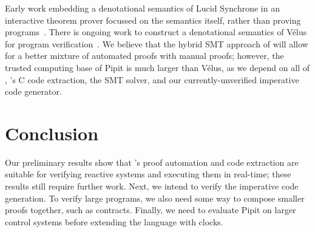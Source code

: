 \documentclass[sigplan,screen, review]{acmart}
\begin{document}
Early work embedding a denotational semantics of Lucid Synchrone in an interactive theorem prover focussed on the semantics itself, rather than proving programs~\cite{boulme2001clocked}.
There is ongoing work to construct a denotational semantics of Vélus for program verification~\cite{bourke2022towards}.
We believe that the hybrid SMT approach of \fstar{} will allow for a better mixture of automated proofs with manual proofs;
however, the trusted computing base of Pipit is much larger than Vélus, as we depend on all of \fstar{}, \lowstar{}'s C code extraction, the SMT solver, and our currently-unverified imperative code generator.




\section{Conclusion}

Our preliminary results show that \fstar{}'s proof automation and code extraction are suitable for verifying reactive systems and executing them in real-time; these results still require further work.
Next, we intend to verify the imperative code generation.
To verify large programs, we also need some way to compose smaller proofs together, such as contracts.
Finally, we need to evaluate Pipit on larger control systems before extending the language with clocks.







\end{document}
